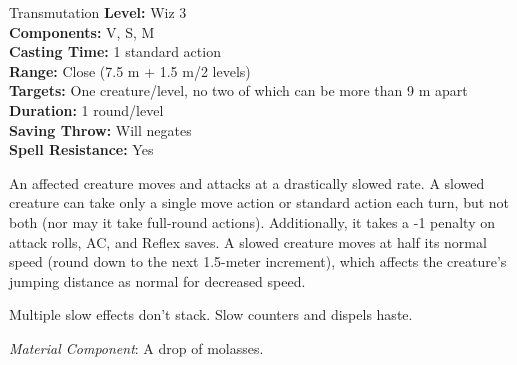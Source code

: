 {Transmutation}
{
	\textbf{Level:}
	Wiz 3\\
	\textbf{Components:}
	V, S, M\\
	\textbf{Casting Time:}
	1 standard action\\
	\textbf{Range:}
	Close (7.5 m + 1.5 m/2 levels)\\
	\textbf{Targets:}
	One creature/level, no two of which can be more than 9 m apart\\
	\textbf{Duration:}
	1 round/level\\
	\textbf{Saving Throw:}
	Will negates\\
	\textbf{Spell Resistance:}
	Yes\\
}
{
	An affected creature moves and attacks at a drastically slowed rate. A slowed creature can take only a single move action or standard action each turn, but not both (nor may it take full-round actions). Additionally, it takes a -1 penalty on attack rolls, AC, and Reflex saves. A slowed creature moves at half its normal speed (round down to the next 1.5-meter increment), which affects the creature's jumping distance as normal for decreased speed.

	Multiple slow effects don't stack. Slow counters and dispels haste.

	\textit{Material Component}:
	A drop of molasses.

}
